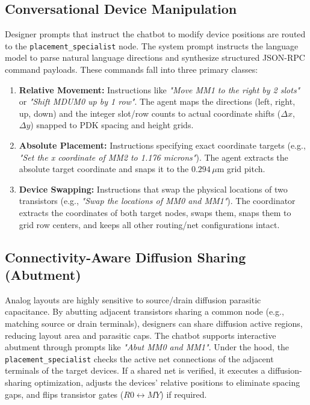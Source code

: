 \subsection{Conversational Device Manipulation}
Designer prompts that instruct the chatbot to modify device positions are routed to the \texttt{placement\_specialist} node. The system prompt instructs the language model to parse natural language directions and synthesize structured JSON-RPC command payloads. These commands fall into three primary classes:
\begin{enumerate}
    \item \textbf{Relative Movement:} Instructions like \textit{"Move MM1 to the right by 2 slots"} or \textit{"Shift MDUM0 up by 1 row"}. The agent maps the directions (left, right, up, down) and the integer slot/row counts to actual coordinate shifts ($\Delta x$, $\Delta y$) snapped to PDK spacing and height grids.
    \item \textbf{Absolute Placement:} Instructions specifying exact coordinate targets (e.g., \textit{"Set the x coordinate of MM2 to 1.176 microns"}). The agent extracts the absolute target coordinate and snaps it to the $0.294\,\mu\text{m}$ grid pitch.
    \item \textbf{Device Swapping:} Instructions that swap the physical locations of two transistors (e.g., \textit{"Swap the locations of MM0 and MM1"}). The coordinator extracts the coordinates of both target nodes, swaps them, snaps them to grid row centers, and keeps all other routing/net configurations intact.
\end{enumerate}

\subsection{Connectivity-Aware Diffusion Sharing (Abutment)}
Analog layouts are highly sensitive to source/drain diffusion parasitic capacitance. By abutting adjacent transistors sharing a common node (e.g., matching source or drain terminals), designers can share diffusion active regions, reducing layout area and parasitic caps. The chatbot supports interactive abutment through prompts like \textit{"Abut MM0 and MM1"}.
Under the hood, the \texttt{placement\_specialist} checks the active net connections of the adjacent terminals of the target devices. If a shared net is verified, it executes a diffusion-sharing optimization, adjusts the devices' relative positions to eliminate spacing gaps, and flips transistor gates ($R0 \leftrightarrow MY$) if required.


